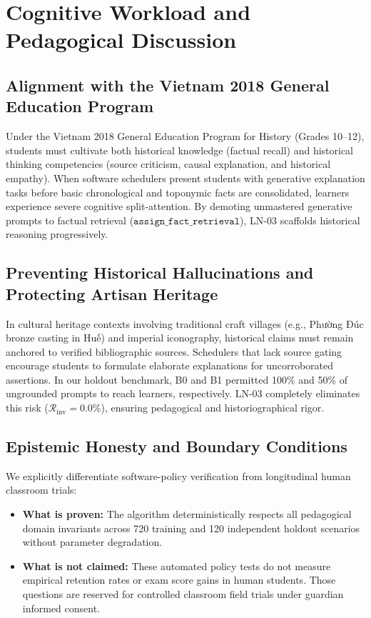 \documentclass[11pt,a4paper]{article}
\begin{document}
\section{Cognitive Workload and Pedagogical Discussion}
\label{sec:discussion}

\subsection{Alignment with the Vietnam 2018 General Education Program}
Under the Vietnam 2018 General Education Program for History (Grades 10--12), students must cultivate both historical knowledge (factual recall) and historical thinking competencies (source criticism, causal explanation, and historical empathy). When software schedulers present students with generative explanation tasks before basic chronological and toponymic facts are consolidated, learners experience severe cognitive split-attention. By demoting unmastered generative prompts to factual retrieval ($\texttt{assign\_fact\_retrieval}$), LN-03 scaffolds historical reasoning progressively.

\subsection{Preventing Historical Hallucinations and Protecting Artisan Heritage}
In cultural heritage contexts involving traditional craft villages (e.g., Phường Đúc bronze casting in Huế) and imperial iconography, historical claims must remain anchored to verified bibliographic sources. Schedulers that lack source gating encourage students to formulate elaborate explanations for uncorroborated assertions. In our holdout benchmark, B0 and B1 permitted 100\% and 50\% of ungrounded prompts to reach learners, respectively. LN-03 completely eliminates this risk ($\mathcal{R}_{\text{inv}} = 0.0\%$), ensuring pedagogical and historiographical rigor.

\subsection{Epistemic Honesty and Boundary Conditions}
We explicitly differentiate software-policy verification from longitudinal human classroom trials:
\begin{itemize}[leftmargin=*]
    \item \textbf{What is proven:} The algorithm deterministically respects all pedagogical domain invariants across 720 training and 120 independent holdout scenarios without parameter degradation.
    \item \textbf{What is not claimed:} These automated policy tests do not measure empirical retention rates or exam score gains in human students. Those questions are reserved for controlled classroom field trials under guardian informed consent.
\end{itemize}
\end{document}
